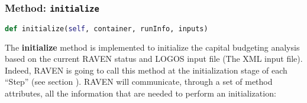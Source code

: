 \subsubsection{Method: \texttt{initialize}}
\label{subsubsec:externalInitializeExternalModelPlugin}
\begin{lstlisting}[language=python]
def initialize(self, container, runInfo, inputs)
\end{lstlisting}

The \textbf{initialize} method is implemented  to initialize the capital budgeting analysis
based on the current RAVEN status and LOGOS input file (The XML input file).
%
 \\Indeed, RAVEN is going to call this method at the initialization stage of
 each ``Step'' (see section \cite{RAVENuserManual}).
%
RAVEN will communicate, through a set of method attributes, all the information
that are needed to perform an initialization:
